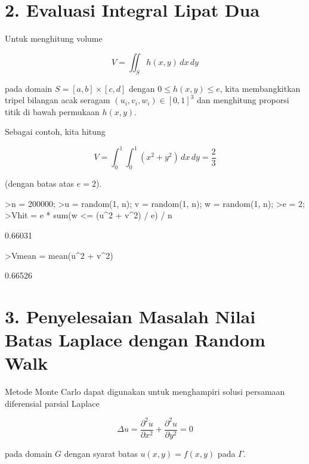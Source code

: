 \documentclass[a4paper,11pt,oneside,enabledeprecatedfontcommands]{scrbook}
\newenvironment{eulernotebook}{}{}
\newcommand{\eulersubheading}[1]{\section{#1}}
\newenvironment{eulercomment}{\par\medskip\noindent}{\par\medskip}
\newenvironment{eulerformula}{}{}
\begin{document}
\begin{eulernotebook}
		\eulersubheading{2. Evaluasi Integral Lipat Dua}
		\begin{eulercomment}
			Untuk menghitung volume
		\end{eulercomment}
		\begin{eulerformula}
			\[
			V = \iint_S h(x, y)\,dx\,dy
			\]
		\end{eulerformula}
		\begin{eulercomment}
			pada domain $S = [a, b] \times [c, d]$ dengan $0 \le h(x, y) \le e$, 
			kita membangkitkan tripel bilangan acak seragam $(u_i, v_i, w_i) \in [0, 1]^3$
			dan menghitung proporsi titik di bawah permukaan $h(x, y)$.
			
			Sebagai contoh, kita hitung
		\end{eulercomment}
		\begin{eulerformula}
			\[
			V = \int_0^1 \int_0^1 (x^2 + y^2)\,dx\,dy = \frac{2}{3}
			\]
		\end{eulerformula}
		\begin{eulercomment}
			(dengan batas atas $e = 2$).
		\end{eulercomment}
		\begin{eulerprompt}
			>n = 200000;
			>u = random(1, n); v = random(1, n); w = random(1, n);
			>e = 2;
			>Vhit = e * sum(w <= (u^2 + v^2) / e) / n
		\end{eulerprompt}
		\begin{euleroutput}
			0.66031
		\end{euleroutput}
		\begin{eulerprompt}
			>Vmean = mean(u^2 + v^2)
		\end{eulerprompt}
		\begin{euleroutput}
			0.66526
		\end{euleroutput}
		
		\eulersubheading{3. Penyelesaian Masalah Nilai Batas Laplace dengan Random Walk}
		\begin{eulercomment}
			Metode Monte Carlo dapat digunakan untuk menghampiri solusi persamaan diferensial parsial Laplace
		\end{eulercomment}
		\begin{eulerformula}
			\[
			\Delta u = \frac{\partial^2 u}{\partial x^2} + \frac{\partial^2 u}{\partial y^2} = 0
			\]
		\end{eulerformula}
		\begin{eulercomment}
			pada domain $G$ dengan syarat batas $u(x, y) = f(x, y)$ pada $\Gamma$.
			

\end{eulercomment}
\end{eulernotebook}
\end{document}
